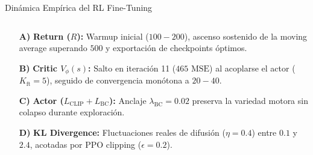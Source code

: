\begin{frame}{Dinámica Empírica del RL Fine-Tuning}
\begin{columns}[T, onlytextwidth]
    \begin{column}{0.44\textwidth}
      \begin{tcolorbox}[
        enhanced,
        colback=WhiteBg,
        colframe=UCNTerracotta,
        arc=\CardArc,
        boxrule=\CardRule,
        height=\CardHeightDouble,
        title={\CardTitleFont Análisis Cuantitativo de los 4 Gráficos},
        colbacktitle=UCNTerracotta,
        coltitle=WhiteBg,
        top=0.8mm, bottom=0.8mm, left=1.4mm, right=1.4mm
      ]
        {\fontsize{5.2}{6.2}\selectfont
        \begin{itemize}\setlength{\itemsep}{0.3pt}
          \item[\textcolor{UCNCyan}{\textbf{A)}}] \textbf{Return ($R$):} Warmup inicial ($100-200$), ascenso sostenido de la moving average superando $500$ y exportación de checkpoints óptimos.
          \item[\textcolor{UCNTerracotta}{\textbf{B)}}] \textbf{Critic $V_\phi(s)$:} Salto en iteración 11 ($465\text{ MSE}$) al acoplarse el actor ($K_{\text{ft}}=5$), seguido de convergencia monótona a $20-40$.
          \item[\textcolor{AgriGreen}{\textbf{C)}}] \textbf{Actor ($L_{\text{CLIP}}+L_{\text{BC}}$):} Anclaje $\lambda_{\text{BC}}=0.02$ preserva la variedad motora sin colapso durante exploración.
          \item[\textcolor{PurpleAction}{\textbf{D)}}] \textbf{KL Divergence:} Fluctuaciones reales de difusión ($\eta=0.4$) entre $0.1$ y $2.4$, acotadas por PPO clipping ($\epsilon=0.2$).
        \end{itemize}}
      \end{tcolorbox}
    \end{column}
  \end{columns}
\end{frame}

